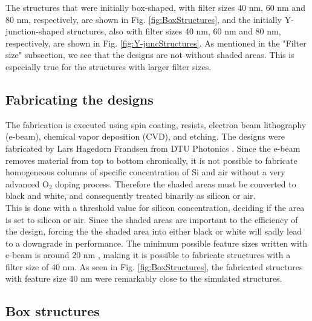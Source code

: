The structures that were initially box-shaped, with filter sizes 40 nm, 60 nm and 80 nm, respectively, are shown in Fig. \ref{fig:BoxStructures}, and  the initially Y-junction-shaped structures, also with filter sizes 40 nm, 60 nm and 80 nm, respectively, are shown in Fig. \ref{fig:Y-juncStructures}. As mentioned in the "Filter size" subsection, we see that the designs are not without shaded areas. This is especially true for the structures with larger filter sizes. \\

\subsection{Fabricating the designs}
The fabrication is executed using spin coating, resists, electron beam lithography (e-beam), chemical vapor deposition (CVD), and etching. The designs were fabricated by Lars Hagedorn Frandsen from DTU Photonics \cite{Fabrication}. Since the e-beam removes material from top to bottom chronically, it is not possible to fabricate homogeneous columns of specific concentration of Si and air without a very advanced O$_2$ doping process. Therefore the shaded areas must be converted to black and white, and consequently treated binarily as silicon or air.\\

This is done with a threshold value for silicon concentration, deciding if the area is set to silicon or air. Since the shaded areas are important to the efficiency of the design, forcing the the shaded area into either black or white will sadly lead to a downgrade in performance. The minimum possible feature sizes written with e-beam is around 20 nm \cite{DanchipOfficial}, making it is possible to fabricate structures with a filter size of 40 nm. As seen in Fig. \ref{fig:BoxStructures}, the fabricated structures with feature size 40 nm were remarkably close to the simulated structures.

\newpage

 \subsection{Box structures}

